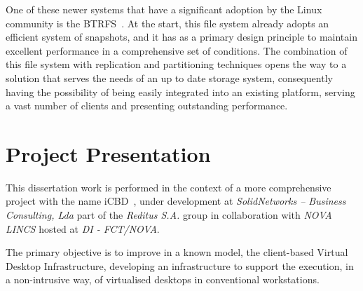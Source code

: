 
One of these newer systems that have a significant adoption by the Linux community is the BTRFS~\cite{Rodeh2013}. At the start, this file system already adopts an efficient system of snapshots, and it has as a primary design principle to maintain excellent performance in a comprehensive set of conditions.
The combination of this file system with replication and partitioning techniques opens the way to a solution that serves the needs of an up to date storage system, consequently having the possibility of being easily integrated into an existing platform, serving a vast number of clients and presenting outstanding performance. 



\section{Project Presentation} %
\label{sec:project_presentation}

This dissertation work is performed in the context of a more comprehensive project with the name \gls{iCBD}~\cite{Lopes2017}, under development at \textit{SolidNetworks – Business Consulting, Lda} part of the \textit{Reditus S.A.} group in collaboration with \textit{NOVA LINCS} hosted at \textit{DI - FCT/NOVA}.

The primary objective is to improve in a known model, the client-based Virtual Desktop Infrastructure, developing an infrastructure to support the execution, in a non-intrusive way, of virtualised desktops in conventional workstations.



